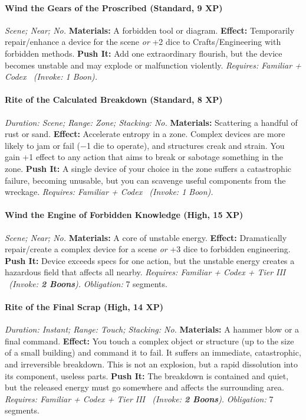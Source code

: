 \paragraph{Wind the Gears of the Proscribed (Standard, 9 XP)} \emph{Scene; Near; No.}
\textbf{Materials:} A forbidden tool or diagram.
\textbf{Effect:} Temporarily repair/enhance a device for the scene \emph{or} +2 dice to Crafts/Engineering with forbidden methods.
\textbf{Push It:} Add one extraordinary flourish, but the device becomes unstable and may explode or malfunction violently.
\emph{Requires: Familiar + Codex \ (\textit{Invoke:} 1 Boon).}
\paragraph{Rite of the Calculated Breakdown (Standard, 8 XP)} \emph{Duration: Scene; Range: Zone; Stacking: No.}
\textbf{Materials:} Scattering a handful of rust or sand.
\textbf{Effect:} Accelerate entropy in a zone. Complex devices are more likely to jam or fail (−1 die to operate), and structures creak and strain. You gain +1 effect to any action that aims to break or sabotage something in the zone.
\textbf{Push It:} A single device of your choice in the zone suffers a catastrophic failure, becoming unusable, but you can scavenge useful components from the wreckage.
\emph{Requires: Familiar + Codex \ (\textit{Invoke:} 1 Boon).}
\paragraph{Wind the Engine of Forbidden Knowledge (High, 15 XP)} \emph{Scene; Near; No.}
\textbf{Materials:} A core of unstable energy.
\textbf{Effect:} Dramatically repair/create a complex device for a scene \emph{or} +3 dice to forbidden engineering.
\textbf{Push It:} Device exceeds specs for one action, but the unstable energy creates a hazardous field that affects all nearby.
\emph{Requires: Familiar + Codex + Tier III \ (\textit{Invoke:} \textbf{2 Boons}).}
\emph{Obligation:} 7 segments.

\paragraph{Rite of the Final Scrap (High, 14 XP)} \emph{Duration: Instant; Range: Touch; Stacking: No.}
\textbf{Materials:} A hammer blow or a final command.
\textbf{Effect:} You touch a complex object or structure (up to the size of a small building) and command it to fail. It suffers an immediate, catastrophic, and irreversible breakdown. This is not an explosion, but a rapid dissolution into its component, useless parts.
\textbf{Push It:} The breakdown is contained and quiet, but the released energy must go somewhere and affects the surrounding area.
\emph{Requires: Familiar + Codex + Tier III \ (\textit{Invoke:} \textbf{2 Boons}).}
\emph{Obligation:} 7 segments.


